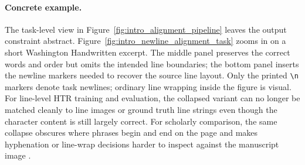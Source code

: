 \paragraph{Concrete example.}
The task-level view in Figure~\ref{fig:intro_alignment_pipeline} leaves the output constraint abstract. Figure~\ref{fig:intro_newline_alignment_task} zooms in on a short Washington Handwritten excerpt. The middle panel preserves the correct words and order but omits the intended line boundaries; the bottom panel inserts the newline markers needed to recover the source line layout. Only the printed \texttt{\textbackslash n} markers denote task newlines; ordinary line wrapping inside the figure is visual. For line-level HTR training and evaluation, the collapsed variant can no longer be matched cleanly to line images or ground truth line strings even though the character content is still largely correct. For scholarly comparison, the same collapse obscures where phrases begin and end on the page and makes hyphenation or line-wrap decisions harder to inspect against the manuscript image .


